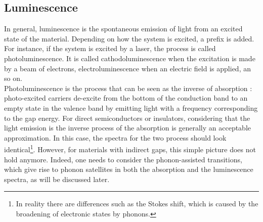 \subsection{Luminescence}
In general, luminescence is the spontaneous emission of light from an excited state of the material. Depending on how the system is excited, a prefix is added. For instance, if the system is excited by a laser, the process is called photoluminescence. It is called cathodoluminescence when the excitation is made by a beam of electrons, electroluminescence when an electric field is applied, an so on.\cite{pelant2012luminescence} \\
Photoluminescence is the process that can be seen as the inverse of absorption : photo-excited carriers de-excite from the bottom of the conduction band to an empty state in the valence band by emitting light with a frequency corresponding to the gap energy. For direct semiconductors or insulators, considering that the light emission is the inverse process of the absorption is generally an acceptable approximation. In this case, the spectra for the two process should look identical\footnote[1]{In reality there are differences such as the Stokes shift, which is caused by the broadening of electronic states by phonons.}. However, for materials with indirect gaps, this simple picture does not hold anymore. Indeed, one needs to consider the phonon-assisted transitions, which give rise to phonon satellites in both the absorption and the luminescence spectra, as will be discussed later. \\

